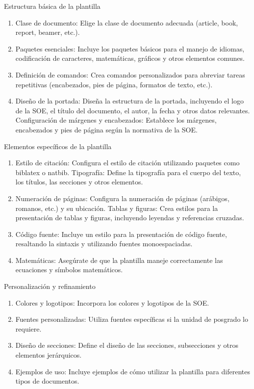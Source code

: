 \documentclass[10pt]{article}
\begin{document}
    Estructura básica de la plantilla
    \begin{enumerate}
    
        \item Clase de documento: Elige la clase de documento adecuada (article, book, report, beamer, etc.).
        \item Paquetes esenciales: Incluye los paquetes básicos para el manejo de idiomas, codificación de caracteres, matemáticas, gráficos y otros elementos comunes.
        \item Definición de comandos: Crea comandos personalizados para abreviar tareas repetitivas (encabezados, pies de página, formatos de texto, etc.).
        \item Diseño de la portada: Diseña la estructura de la portada, incluyendo el logo de la SOE, el título del documento, el autor, la fecha y otros datos relevantes.
    Configuración de márgenes y encabezados: Establece los márgenes, encabezados y pies de página según la normativa de la SOE.
    \end{enumerate}

    Elementos específicos de la plantilla
    \begin{enumerate}
        \item Estilo de citación: Configura el estilo de citación utilizando paquetes como biblatex o natbib.
    Tipografía: Define la tipografía para el cuerpo del texto, los títulos, las secciones y otros elementos.
        \item Numeración de páginas: Configura la numeración de páginas (arábigos, romanos, etc.) y su ubicación.
    Tablas y figuras: Crea estilos para la presentación de tablas y figuras, incluyendo leyendas y referencias cruzadas.
        \item Código fuente: Incluye un estilo para la presentación de código fuente, resaltando la sintaxis y utilizando fuentes monoespaciadas.
        \item Matemáticas: Asegúrate de que la plantilla maneje correctamente las ecuaciones y símbolos matemáticos.
    \end{enumerate}
    
    Personalización y refinamiento
    \begin{enumerate}
    
        \item Colores y logotipos: Incorpora los colores y logotipos de la SOE.
        \item Fuentes personalizadas: Utiliza fuentes específicas si la unidad de posgrado lo requiere.
        \item Diseño de secciones: Define el diseño de las secciones, subsecciones y otros elementos jerárquicos.
        \item Ejemplos de uso: Incluye ejemplos de cómo utilizar la plantilla para diferentes tipos de documentos.
    \end{enumerate}
    
\end{document}
